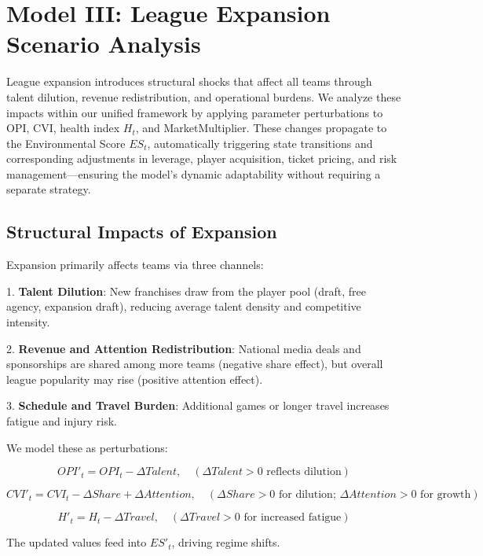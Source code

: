\documentclass{mcmthesis}
\begin{document}
\section{Model III: League Expansion Scenario Analysis}
\label{sec:expansion}

League expansion introduces structural shocks that affect all teams through talent dilution, revenue redistribution, and operational burdens. We analyze these impacts within our unified framework by applying parameter perturbations to OPI, CVI, health index $H_t$, and MarketMultiplier. These changes propagate to the Environmental Score $ES_t$, automatically triggering state transitions and corresponding adjustments in leverage, player acquisition, ticket pricing, and risk management—ensuring the model's dynamic adaptability without requiring a separate strategy.

\subsection{Structural Impacts of Expansion}
Expansion primarily affects teams via three channels:

1. \textbf{Talent Dilution}: New franchises draw from the player pool (draft, free agency, expansion draft), reducing average talent density and competitive intensity.
   
2. \textbf{Revenue and Attention Redistribution}: National media deals and sponsorships are shared among more teams (negative share effect), but overall league popularity may rise (positive attention effect).

3. \textbf{Schedule and Travel Burden}: Additional games or longer travel increases fatigue and injury risk.

We model these as perturbations:

\[
OPI'_t = OPI_t - \Delta Talent, \quad (\Delta Talent > 0 \text{ reflects dilution})
\]

\[
CVI'_t = CVI_t - \Delta Share + \Delta Attention, \quad (\Delta Share > 0 \text{ for dilution; } \Delta Attention > 0 \text{ for growth})
\]

\[
H'_t = H_t - \Delta Travel, \quad (\Delta Travel > 0 \text{ for increased fatigue})
\]

The updated values feed into $ES'_t$, driving regime shifts.
\end{document}
